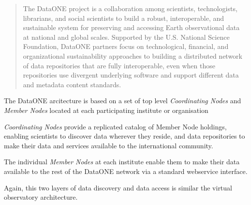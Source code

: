 \documentclass{article}
\begin{document}
\begin{quote}
The DataONE project is a collaboration among scientists, technologists,
librarians, and social scientists to build a robust, interoperable, and
sustainable system for preserving and accessing Earth observational data at
national and global scales. Supported by the U.S. National Science Foundation,
DataONE partners focus on technological, financial, and organizational
sustainability approaches to building a distributed network of data repositories
that are fully interoperable, even when those repositories use divergent
underlying software and support different data and metadata content standards.
\end{quote}

The DataONE arcitecture is based on a set of top level 
\textit{Coordinating Nodes}
and
\textit{Member Nodes}
located at each participating institute or organisation

\textit{Coordinating Nodes}
provide a replicated catalog of Member Node holdings, enabling
scientists to discover data wherever they reside,
and data repositories to make their data and services available
to the international community.

The individual \textit{Member Nodes}
at each institute enable them to make their data available
to the rest of the DataONE network
via a standard webservice interface.

Again, this two layers of data discovery and data access
is similar the virtual observatory architecture.










 



















%
%

\printbibliography
\end{document}
